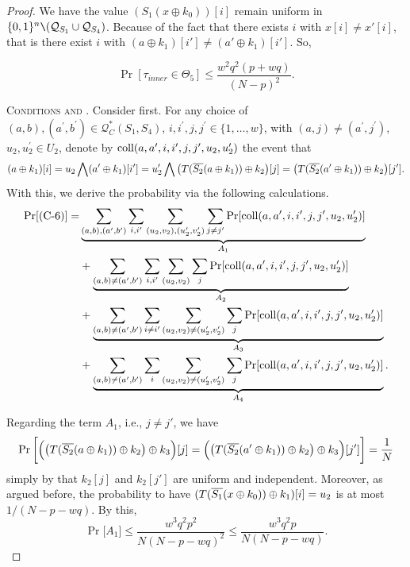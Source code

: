 \begin{proof}



We have the value $\left(S_{1}\left(x \oplus k_{0}\right)\right)[i]$ remain uniform in $\{0, 1\}^{n} \verb|\| (\mathcal{Q}_{S_{1}} \cup \mathcal{Q}_{S_{4}})$.  Because of the fact that there exists $i$ with $x[i]\neq x'[i]$, that is there exist $i$ with $\left(a \oplus k_{1}\right)[i'] \neq \left(a' \oplus k_{1}\right)[i']$. So,

$$
\operatorname{Pr}\left[\tau_{inner} \in \Theta_{5}\right] \leq \frac{w^{2} q^{2} (p+w q)}{(N-p)^2}.
$$





\smallskip
\noindent\textsc{Conditions \csix and \cnine}. Consider \csix first. For any choice of $(a, b), (a^{\prime}, b^{\prime}) \in \mathcal{Q}_{C}^{*}\left(S_{1}, S_{4}\right)$, $i, i^{\prime},j, j^{\prime} \in\{1, \ldots, w\}$, with $(a, j) \neq \left(a^{\prime}, j^{\prime}\right)$, $u_{2}, u_{2}^{\prime} \in U_{2}$, denote by $\text{coll}(a,a',i,i',j,j',u_2,u_2')$ the event that
%
%
$$(a \oplus k_1)[i] = u_2\bigwedge(a' \oplus k_1)[i'] = u_2'\bigwedge\big(T(\overline{S_2}(a\oplus k_1))\oplus k_2\big)[j]=\big(T(\overline{S_2}(a'\oplus k_1))\oplus k_2\big)[j'].
$$
%
%
With this, we derive the probability via the following calculations.
%
%
\begin{align*}
\Pr[\text{(C-6)}]  
=   &  \underbrace{\sum_{(a,b),(a',b')}\sum_{i,i'}\sum_{(u_2,v_2),(u_2',v_2')}\sum_{j\neq j'}\Pr[\text{coll}(a,a',i,i',j,j',u_2,u_2')]}_{A_1}    \\
&  + \underbrace{\sum_{(a,b)\neq(a',b')}\sum_{i,i'}\sum_{(u_2,v_2)}\sum_{j}\Pr[\text{coll}(a,a',i,i',j,j',u_2,u_2')]}_{A_2}      \\
&  +  \underbrace{\sum_{(a,b)\neq(a',b')}\sum_{i\neq i'}\sum_{(u_2,v_2)\neq(u_2',v_2')}\sum_{j}\Pr[\text{coll}(a,a',i,i',j,j',u_2,u_2')]}_{A_3}       \\
&  + \underbrace{\sum_{(a,b)\neq(a',b')}\sum_{i}\sum_{(u_2,v_2)\neq(u_2',v_2')}\sum_{j}\Pr[\text{coll}(a,a',i,i',j,j',u_2,u_2')]}_{A_4}   .
\end{align*}



Regarding the term $A_1$, i.e., $j\neq j'$, we have
%
$$\Pr\bigg[\Big(\big(T(\overline{S_2}(a\oplus k_1))\oplus k_2\big)\oplus k_3\Big)[j]=\Big(\big(T(\overline{S_2}(a'\oplus k_1))\oplus k_2\big)\oplus k_3\Big)[j']\bigg]=\frac{1}{N}$$
simply by that $k_2[j]$ and $k_2[j']$ are uniform and independent. Moreover, as argued before, the probability to have $(T(\overline{S_1}(x\oplus k_0))\oplus k_1)[i]=u_2$ is at most $1/(N-p-wq)$. By this,
%
$$\Pr\big[A_1\big]\leq\frac{w^3q^2p^2}{N(N-p-wq)^2}\leq\frac{w^3q^2p}{N(N-p-wq)}.$$




\end{proof}
